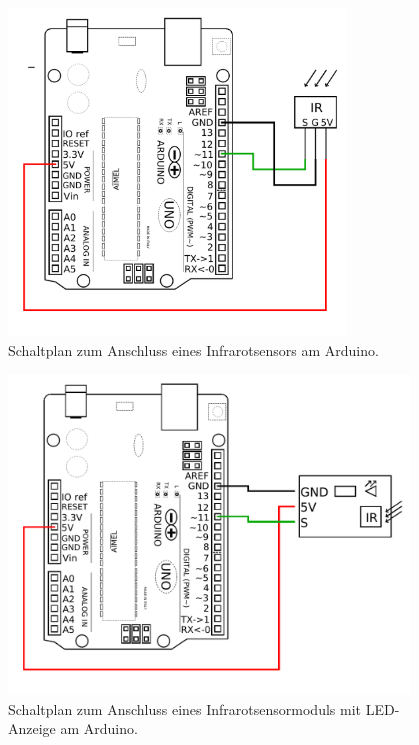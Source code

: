 \begin{minipage}{0.48\textwidth}
	\begin{figure}[H]
		\centering
		\includegraphics[width=0.8\textwidth]{./Zeichnungen/schaltplan-ir-sensor.png}
		\caption{Schaltplan zum Anschluss eines Infrarotsensors am Arduino.}
	\end{figure}
\end{minipage}
\hfill
\begin{minipage}{0.48\textwidth}
	\begin{figure}[H]
		\centering
		\includegraphics[width=0.95\textwidth]{./Zeichnungen/schaltplan-ir-sensor-modul.png}
		\caption{Schaltplan zum Anschluss eines Infrarotsensormoduls mit LED-Anzeige am Arduino.}
	\end{figure}
\end{minipage}
\medskip

